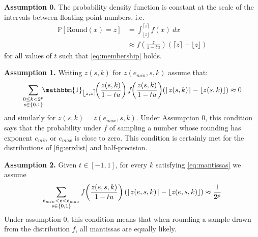 \documentclass[10pt,conference]{IEEEtran}
\newcommand{\ie}{i.e.\ }
\newcommand{\Pro}[1]{\mathbb{P}\left[ #1 \right]}
\newcommand{\round}{\mathrm{Round}}
\newcommand{\ceil}[1]{\lceil #1 \rceil}
\newcommand{\floor}[1]{\lfloor #1 \rfloor}
\newcommand{\fintvl}[1][x]{\mathlarger{\lfloor}#1,#1\mathlarger{\rceil}}
\newcommand{\one}{\mathbbm{1}}
\begin{document}
\noindent \textbf{Assumption 0.} The probability density function is constant at the scale of the intervals between floating point numbers, \ie
\begin{align*}
\Pro{\round(x)=z}
&=\int_{\floor{z}}^{\ceil{z}} f(x)~dx 
\\
&\approx f\left(\frac{z}{1-tu}\right)(\ceil{z}-\floor{z})
\end{align*}
for all values of $t$ such that \cref{eq:membership} holds.

\noindent  \textbf{Assumption 1.} Writing $z(s,k)$ for $z(e_{min},s,k)$ assume that:
\[
\sum_{\substack{0\leq k<2^p\\ s\in\{0,1\}}}\hspace{-4pt}\one_{\fintvl[z]}\hspace{-4pt}\left(\frac{z(s,k)}{1-tu}\right)f\hspace{-3pt}\left(\frac{z(s,k)}{1-tu}\right)\hspace{-2pt}(\ceil{z(s,k)}-\floor{z(s,k)})\approx 0
\]
and similarly for $z(s,k)=z(e_{max},s,k)$.
Under Assumption 0, this condition says that the probability under $f$ of sampling a number whose rounding has exponent $e_{min}$ or $e_{max}$ is close to zero. This condition is certainly met for the distributions of \cref{fig:errdist} and half-precision.

\noindent \textbf{Assumption 2.} Given $t\in\left[-1,1\right]$, for every $k$ satisfying \cref{eq:mantissas} we assume
\[
\sum_{\substack{e_{min}<e<e_{max}\\ s\in\{0,1\}}}f\hspace{-2pt}\left(\frac{z(e,s,k)}{1-tu}\right)(\ceil{z(e,s,k)}-\floor{z(e,s,k)})\approx \frac{1}{2^p}
\]
Under assumption 0, this condition means that when rounding a sample drawn from the distribution $f$, all mantissas are equally likely.
\end{document}
